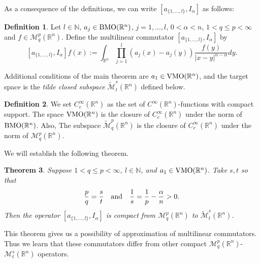 \documentclass[11pt,a4]{article}
\numberwithin{equation}{section}
\newtheorem{theorem}{Theorem}[section]
\theoremstyle{definition}
\newtheorem{definition}[theorem]{Definition}
\theoremstyle{remark}
\begin{document}
As a consequence of the definitions, we can write $[{a_{\{1,...,l\}}},I_{\alpha}]$ as follows:


\begin{definition}
	Let $l \in \mathbb N$, $a_j \in {\rm BMO}({\mathbb R}^n)$, $j=1,...,l$, $0<\alpha<n$, $1 < q \le p < \infty$ and $f \in {\mathcal M}^{p}_q({\mathbb R}^n)$. Define the multilinear commutator $[a_{\{1, ... ,l\}},I_{\alpha}]$ by 
	\[
		[a_{\{1, ... ,l\}},I_{\alpha}]f(x):=\int_{{\mathbb R}^n}\prod_{j=1}^l(a_j(x)-a_j(y))\frac{f(y)}{|x-y|^{n-\alpha}}dy.
	\]
\end{definition}

Additional conditions of the main theorem are $a_1 \in {\rm VMO}({\mathbb R}^n)$, and the target space is the {\it tilde closed subspace} $\widetilde{\mathcal M}^{s}_t({\mathbb R}^n)$ defined below.

\begin{definition}
	We set $C_c^{\infty}({\mathbb R}^n)$ as the set of $C^{\infty}({\mathbb R}^n)$-functions with compact support. The space ${\rm VMO}({\mathbb R}^n)$ is the closure of $C_c^{\infty}({\mathbb R}^n)$ under the norm of ${\rm BMO}({\mathbb R}^n)$. 
	Also, The subspace $\widetilde{\mathcal M}^{p}_q({\mathbb R}^n)$ is the closure of  $C_c^{\infty}({\mathbb R}^n)$ under the norm of $ {\mathcal M}^{p}_q({\mathbb R}^n)$.
\end{definition}



We will establish the following theorem.
\begin{theorem}\label{main}
	Suppose $1 < q \le p < \infty$, $l \in \mathbb{N}$, and $a_1 \in {\rm VMO}({\mathbb R}^n)$. Take $s, t$ so that
		\[
			\frac{p}{q}=\frac{s}{t} \quad {\rm and} \quad \frac{1}{s}=\frac{1}{p}-\frac{\alpha}{n} > 0.
		\]
	Then the operator $[a_{\{1, ... ,l\}},I_{\alpha}]$ is compact from ${\mathcal M}^{p}_q({\mathbb R}^n)$ to 
	$\widetilde{\mathcal M}^{s}_t({\mathbb R}^n)$.
\end{theorem}
This theorem gives us a possibility of approximation of multilinear commutators. Thus we learn that these commutators differ from other compact ${\mathcal M}^{p}_q({\mathbb R}^n)$-${\mathcal M}^{s}_t({\mathbb R}^n)$ operators. 
\end{document}

